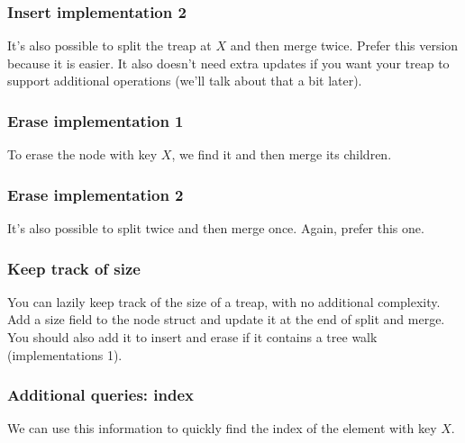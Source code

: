\begin{frame}
	\frametitle{Insert implementation 2}

	It's also possible to split the treap at $X$ and then merge twice. Prefer this version because it is easier. It also doesn't need extra updates if you want your treap to support additional operations (we'll talk about that a bit later).
	
	\begin{center}
		
	\end{center}
\end{frame}

\begin{frame}
	\frametitle{Erase implementation 1}

	To erase the node with key $X$, we find it and then merge its children.

	\begin{center}
		
	\end{center}
\end{frame}

\begin{frame}
	\frametitle{Erase implementation 2}

	It's also possible to split twice and then merge once. Again, prefer this one.

	\begin{center}
		
	\end{center}
\end{frame}


\begin{frame}
	\frametitle{Keep track of size}

	You can lazily keep track of the size of a treap, with no additional complexity. Add a size field to the node struct and update it at the end of split and merge. You should also add it to insert and erase if it contains a tree walk (implementations 1).

	\begin{center}
		
	\end{center}
\end{frame}

\begin{frame}
	\frametitle{Additional queries: index}

	We can use this information to quickly find the index of the element with key $X$.

	\begin{center}
		
	\end{center}
\end{frame}

